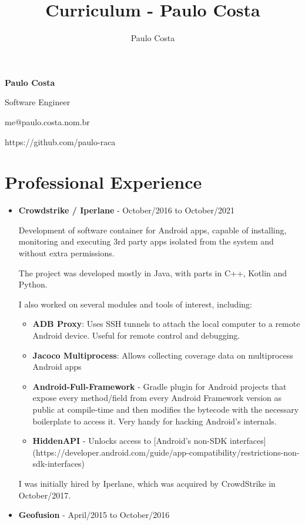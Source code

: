 \documentclass[a4paper,10pt]{article}
\title{Curriculum - Paulo Costa}
\author{Paulo Costa}
\begin{document}
  \LARGE\textbf{Paulo Costa}

  \large Software Engineer

  \large me@paulo.costa.nom.br
  
  \large https://github.com/paulo-raca



  \normalsize 
  
  \section{Professional Experience}
    \begin{itemize}
      \item
        \textbf{Crowdstrike / Iperlane} - October/2016 to October/2021

        Development of software container for Android apps, capable of installing, monitoring and executing 3rd
        party apps isolated from the system and without extra permissions.
        
        The project was developed mostly in Java, with parts in C++, Kotlin and Python.

        I also worked on several modules and tools of interest, including:

        \begin{itemize}
          \item \textbf{ADB Proxy}: Uses SSH tunnels to attach the local computer to a remote Android device. Useful for remote control and debugging.
          \item \textbf{Jacoco Multiprocess}: Allows collecting coverage data on multiprocess Android apps
          \item \textbf{Android-Full-Framework} - Gradle plugin for Android projects that expose every method/field from every Android Framework version as public at compile-time and then modifies the bytecode with the necessary boilerplate to access it. Very handy for hacking Android's internals.
          \item \textbf{HiddenAPI} - Unlocks access to [Android's non-SDK interfaces](https://developer.android.com/guide/app-compatibility/restrictions-non-sdk-interfaces)
        \end{itemize}

        I was initially hired by Iperlane, which was acquired by CrowdStrike in October/2017.

      \item
        \textbf{Geofusion} - April/2015 to October/2016
        

\end{itemize}
\end{document}
